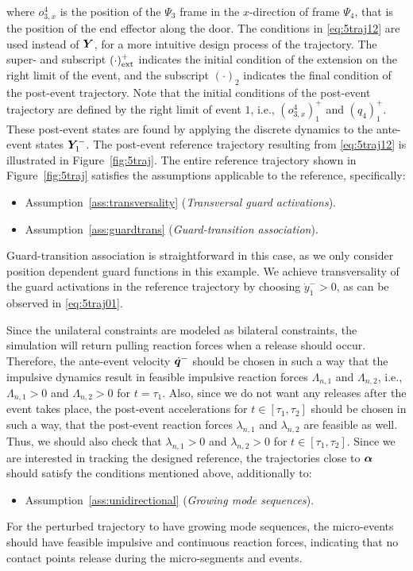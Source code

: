 \documentclass[../DC2019003Bouma.tex]{subfiles}
\begin{document}
where $o_{3,x}^4$ is the position of the $\Psi_3$ frame in the $x$-direction of frame $\Psi_4$, that is the position of the end effector along the door. The conditions in \eqref{eq:5traj12} are used instead of ${\boldsymbol{Y}}$, for a more intuitive design process of the trajectory. The super- and subscript $(\cdot)_{\textnormal{ext}}^+$ indicates the initial condition of the extension on the right limit of the event, and the subscript $(\cdot)_2$ indicates the final condition of the post-event trajectory. Note that the initial conditions of the post-event trajectory are defined by the right limit of event $1$, i.e., $(o_{3,x}^4)^+_1$ and $(q_4)^+_1$. These post-event states are found by applying the discrete dynamics to the ante-event states ${\boldsymbol{Y}}_1^-$. The post-event reference trajectory resulting from \eqref{eq:5traj12} is illustrated in Figure~\ref{fig:5traj}. The entire reference trajectory shown in Figure~\ref{fig:5traj} satisfies the assumptions applicable to the reference, specifically:
\begin{itemize}
\item Assumption~\ref{ass:transversality} (\textit{Transversal guard activations}).
\item Assumption~\ref{ass:guardtrans} (\textit{Guard-transition association}).
\end{itemize}
Guard-transition association is straightforward in this case, as we only consider position dependent guard functions in this example. We achieve transversality of the guard activations in the reference trajectory by choosing $\dot{y}^-_1>0$, as can be observed in \eqref{eq:5traj01}. 

Since the unilateral constraints are modeled as bilateral constraints, the simulation will return pulling reaction forces when a release should occur. Therefore, the ante-event velocity $\dot{{\boldsymbol{q}}}^-$ should be chosen in such a way that the impulsive dynamics result in feasible impulsive reaction forces $\Lambda_{n,1}$ and $\Lambda_{n,2}$, i.e., $\Lambda_{n,1}>0$ and $\Lambda_{n,2}>0$ for $t = \tau_1$.  Also, since we do not want any releases after the event takes place, the post-event accelerations for $t\in[\tau_1,\tau_2]$ should be chosen in such a way, that the post-event reaction forces $\lambda_{n,1}$ and $\lambda_{n,2}$ are feasible as well. Thus, we should also check that $\lambda_{n,1}>0$ and $\lambda_{n,2}>0$ for $t\in[\tau_1,\tau_2]$. Since we are interested in tracking the designed reference, the trajectories close to $\boldsymbol{\alpha}$ should satisfy the conditions mentioned above, additionally to:
\begin{itemize}
\item Assumption~\ref{ass:unidirectional} (\textit{Growing mode sequences}).
\end{itemize} 
For the perturbed trajectory to have growing mode sequences, the micro-events should have feasible impulsive and continuous reaction forces, indicating that no contact points release during the micro-segments and events.
\end{document}
